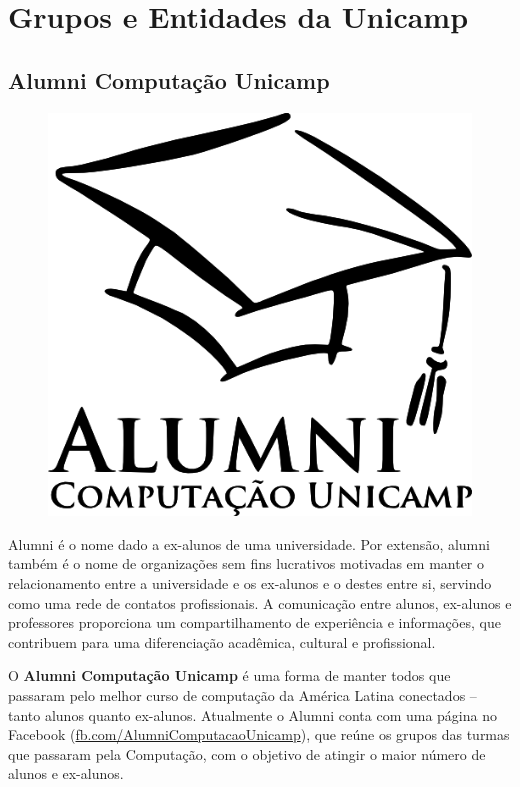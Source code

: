 
\section{Grupos e Entidades da Unicamp}

\subsection{Alumni Computação Unicamp}

\begin{figure}[H]
    \centering
    \includegraphics[scale=0.40]{img/alumni_comp.png}
\end{figure}

Alumni é o nome dado a ex-alunos de uma universidade. Por extensão,
alumni também é o nome de organizações sem fins lucrativos motivadas em manter
o relacionamento entre a universidade e os ex-alunos e o destes entre si, servindo como uma rede
de contatos profissionais. A comunicação entre alunos, ex-alunos e professores proporciona um compartilhamento de experiência e informações, que contribuem para uma diferenciação acadêmica, cultural e profissional.

O \textbf{Alumni Computação Unicamp} é uma forma de manter todos que passaram
pelo melhor curso de computação da América Latina conectados -- tanto alunos
quanto ex-alunos. Atualmente o Alumni conta com uma página no Facebook (\url{fb.com/AlumniComputacaoUnicamp}), que reúne os grupos das turmas que passaram pela Computação, com o objetivo de atingir o maior número de alunos e ex-alunos.

